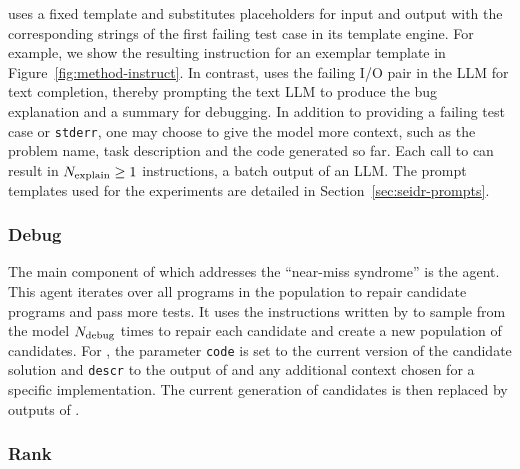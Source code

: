\instructs{} uses a fixed template and substitutes placeholders for input and output with the corresponding strings of the first failing test case in its template engine.
For example, we show the resulting instruction for an exemplar template in Figure~\ref{fig:method-instruct}.
In contrast, \instructllm{} uses the failing I/O pair in the LLM for text completion, thereby prompting the text LLM to produce the bug explanation and a summary for debugging. 
In addition to providing a failing test case or \texttt{stderr}, one may choose to give the model \textmodelnoargs{} more context, such as the problem name, task description and the code generated so far. 
Each call to \textmodelnoargs{} can result in $N_\text{explain}{}\ge1$ instructions, a batch output of an LLM.
The prompt templates used for the experiments are detailed in Section~\ref{sec:seidr-prompts}.








\subsubsection{Debug}

The main component of \method{} which addresses the ``near-miss syndrome'' is the \debug{} agent.  
This agent iterates over all programs in the population to repair candidate programs and pass more tests. 
It uses the instructions written by \instruct{} to sample from the \debugmodelnoargs{} model $N_\text{debug}{}$ times
to repair each candidate and create a new population of \treearity{} candidates.
For \debugmodelnoargs{}, the parameter \texttt{code} is set to the current version of the candidate solution and \texttt{descr} to the output of \instruct{} and any additional context chosen for a specific implementation.
The current generation of candidates is then replaced by \treearity{} outputs of \debug{}.

\subsubsection{Rank}

